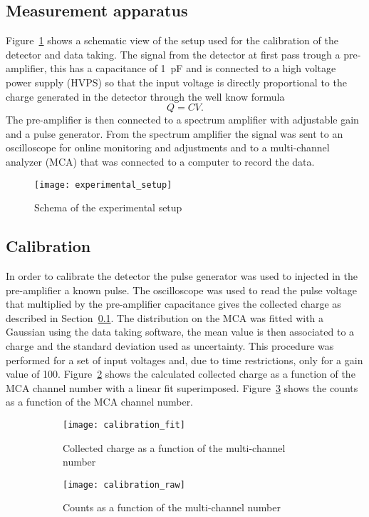 \subsection{Measurement apparatus}
\label{sec:meas-appar}
Figure~\ref{fig:exp_setup} shows a schematic view of the setup used for the
calibration of the detector and data taking. The signal from the detector at
first pass trough a pre-amplifier, this has a capacitance of 1~pF and is
connected to a high voltage power supply (HVPS) so that the input voltage is
directly proportional to the charge generated in the detector through the well
know formula\autocite{Knoll:RadMeasurement}
\begin{equation}
  \label{eq:capacitance}
  Q = CV.
\end{equation}
The pre-amplifier is then connected to a spectrum amplifier with adjustable gain
and a pulse generator. From the spectrum amplifier the signal was sent to an
oscilloscope for online monitoring and adjustments and to a multi-channel
analyzer (MCA) that was connected to a computer to record the data.
\begin{figure}[!h]
  \centering
  \texttt{[image: experimental\_setup]}
  \caption{Schema of the experimental setup}
  \label{fig:exp_setup}
\end{figure}

\subsection{Calibration}
\label{sec:calibration}
In order to calibrate the detector the pulse generator was used to injected in
the pre-amplifier a known pulse. The oscilloscope was used to read the pulse
voltage that multiplied by the pre-amplifier capacitance gives the collected
charge as described in Section~\ref{sec:meas-appar}. The distribution on the MCA
was fitted with a Gaussian using the data taking software, the mean value is
then associated to a charge and the standard deviation used as uncertainty. This
procedure was performed for a set of input voltages and, due to time
restrictions, only for a gain value of 100. Figure~\ref{fig:calibration_fit}
shows the calculated collected charge as a function of the MCA channel number
with a linear fit superimposed. Figure~\ref{fig:calibration_raw} shows the
counts as a function of the MCA channel number.
\begin{figure}[!h]
  \centering
  \begin{subfigure}[t]{.48\linewidth}
    \texttt{[image: calibration\_fit]}
    \caption{Collected charge as a function of the multi-channel number}
    \label{fig:calibration_fit}
  \end{subfigure}
  \begin{subfigure}[t]{.48\linewidth}
    \texttt{[image: calibration\_raw]}
    \caption{Counts as a function of the multi-channel number}
    \label{fig:calibration_raw}
  \end{subfigure}
  \caption{}
  \label{fig:calibration}
\end{figure}
